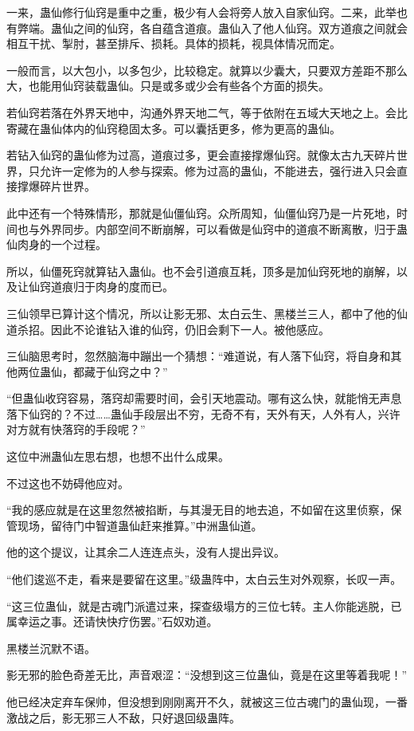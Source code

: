 \begin{this_body}
一来，蛊仙修行仙窍是重中之重，极少有人会将旁人放入自家仙窍。二来，此举也有弊端。蛊仙之间的仙窍，各自蕴含道痕。蛊仙入了他人仙窍。双方道痕之间就会相互干扰、掣肘，甚至排斥、损耗。具体的损耗，视具体情况而定。

一般而言，以大包小，以多包少，比较稳定。就算以少囊大，只要双方差距不那么大，也能用仙窍装载蛊仙。只是或多或少会有些各个方面的损失。

若仙窍若落在外界天地中，沟通外界天地二气，等于依附在五域大天地之上。会比寄藏在蛊仙体内的仙窍稳固太多。可以囊括更多，修为更高的蛊仙。

若钻入仙窍的蛊仙修为过高，道痕过多，更会直接撑爆仙窍。就像太古九天碎片世界，只允许一定修为的人参与探索。修为过高的蛊仙，不能进去，强行进入只会直接撑爆碎片世界。

此中还有一个特殊情形，那就是仙僵仙窍。众所周知，仙僵仙窍乃是一片死地，时间也与外界同步。内部空间不断崩解，可以看做是仙窍中的道痕不断离散，归于蛊仙肉身的一个过程。

所以，仙僵死窍就算钻入蛊仙。也不会引道痕互耗，顶多是加仙窍死地的崩解，以及让仙窍道痕归于肉身的度而已。

三仙领早已算计这个情况，所以让影无邪、太白云生、黑楼兰三人，都中了他的仙道杀招。因此不论谁钻入谁的仙窍，仍旧会剩下一人。被他感应。

三仙脑思考时，忽然脑海中蹦出一个猜想：“难道说，有人落下仙窍，将自身和其他两位蛊仙，都藏于仙窍之中？”

“但蛊仙收窍容易，落窍却需要时间，会引天地震动。哪有这么快，就能悄无声息落下仙窍的？不过……蛊仙手段层出不穷，无奇不有，天外有天，人外有人，兴许对方就有快落窍的手段呢？”

这位中洲蛊仙左思右想，也想不出什么成果。

不过这也不妨碍他应对。

“我的感应就是在这里忽然被掐断，与其漫无目的地去追，不如留在这里侦察，保管现场，留待门中智道蛊仙赶来推算。”中洲蛊仙道。

他的这个提议，让其余二人连连点头，没有人提出异议。

“他们逡巡不走，看来是要留在这里。”级蛊阵中，太白云生对外观察，长叹一声。

“这三位蛊仙，就是古魂门派遣过来，探查级塌方的三位七转。主人你能逃脱，已属幸运之事。还请快快疗伤罢。”石奴劝道。

黑楼兰沉默不语。

影无邪的脸色奇差无比，声音艰涩：“没想到这三位蛊仙，竟是在这里等着我呢！”

他已经决定弃车保帅，但没想到刚刚离开不久，就被这三位古魂门的蛊仙现，一番激战之后，影无邪三人不敌，只好退回级蛊阵。


\end{this_body}
